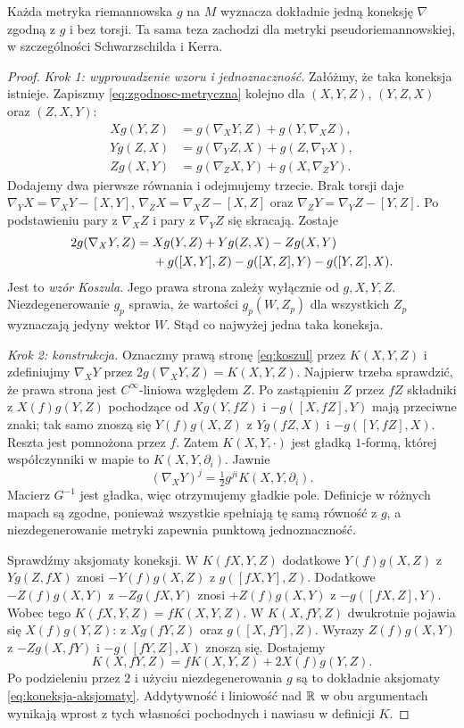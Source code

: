 \begin{twierdzenie}
\label{thm:levi-civita}
Każda metryka riemannowska $g$ na $M$ wyznacza
dokładnie jedną koneksję $\nabla$ zgodną z $g$
i bez torsji. Ta sama teza zachodzi dla metryki
pseudoriemannowskiej, w szczególności
Schwarzschilda i Kerra.
\end{twierdzenie}
\begin{proof}
\emph{Krok 1: wyprowadzenie wzoru i jednoznaczność.}
Załóżmy, że taka koneksja istnieje. Zapiszmy
\eqref{eq:zgodnosc-metryczna} kolejno dla
$(X,Y,Z)$, $(Y,Z,X)$ oraz $(Z,X,Y)$:
\begin{align*}
 Xg(Y,Z)&=g(\nabla_XY,Z)+g(Y,\nabla_XZ),\\
 Yg(Z,X)&=g(\nabla_YZ,X)+g(Z,\nabla_YX),\\
 Zg(X,Y)&=g(\nabla_ZX,Y)+g(X,\nabla_ZY).
\end{align*}
Dodajemy dwa pierwsze równania i odejmujemy
trzecie. Brak torsji daje
$\nabla_YX=\nabla_XY-[X,Y]$,
$\nabla_ZX=\nabla_XZ-[X,Z]$ oraz
$\nabla_ZY=\nabla_YZ-[Y,Z]$.
Po podstawieniu pary z $\nabla_XZ$ i pary
z $\nabla_YZ$ się skracają. Zostaje
\begin{align}\label{eq:koszul}
2g(\nabla_XY,Z)={}&Xg(Y,Z)+Yg(Z,X)-Zg(X,Y)\notag\\
 &+g([X,Y],Z)-g([X,Z],Y)-g([Y,Z],X).
\end{align}
Jest to \emph{wzór Koszula}. Jego prawa strona
zależy wyłącznie od $g,X,Y,Z$. Niezdegenerowanie
$g_p$ sprawia, że wartości $g_p(W,Z_p)$ dla
wszystkich $Z_p$ wyznaczają jedyny wektor $W$.
Stąd co najwyżej jedna taka koneksja.

\emph{Krok 2: konstrukcja.} Oznaczmy prawą stronę
\eqref{eq:koszul} przez $K(X,Y,Z)$ i zdefiniujmy
$\nabla_XY$ przez $2g(\nabla_XY,Z)=K(X,Y,Z)$.
Najpierw trzeba sprawdzić, że prawa strona
jest $C^\infty$-liniowa względem $Z$.
Po zastąpieniu $Z$ przez $fZ$ składniki z
$X(f)g(Y,Z)$ pochodzące od
$Xg(Y,fZ)$ i $-g([X,fZ],Y)$ mają przeciwne znaki;
tak samo znoszą się $Y(f)g(X,Z)$ z
$Yg(fZ,X)$ i $-g([Y,fZ],X)$.
Reszta jest pomnożona przez $f$.
Zatem $K(X,Y,\cdot)$ jest gładką $1$-formą,
której współczynniki w mapie to $K(X,Y,\partial_i)$.
Jawnie
\[
 (\nabla_XY)^j=\tfrac12g^{ji}K(X,Y,\partial_i).
\]
Macierz $G^{-1}$ jest gładka, więc otrzymujemy gładkie pole.
Definicje w różnych mapach są zgodne, ponieważ wszystkie
spełniają tę samą równość z $g$, a niezdegenerowanie
metryki zapewnia punktową jednoznaczność.

Sprawdźmy aksjomaty koneksji. W $K(fX,Y,Z)$
dodatkowe $Y(f)g(X,Z)$ z $Yg(Z,fX)$
znosi $-Y(f)g(X,Z)$ z $g([fX,Y],Z)$.
Dodatkowe $-Z(f)g(X,Y)$ z $-Zg(fX,Y)$
znosi $+Z(f)g(X,Y)$ z $-g([fX,Z],Y)$.
Wobec tego $K(fX,Y,Z)=fK(X,Y,Z)$.
W $K(X,fY,Z)$ dwukrotnie pojawia się
$X(f)g(Y,Z)$: z $Xg(fY,Z)$ oraz
$g([X,fY],Z)$. Wyrazy $Z(f)g(X,Y)$
z $-Zg(X,fY)$ i $-g([fY,Z],X)$
znoszą się. Dostajemy
\[
 K(X,fY,Z)=fK(X,Y,Z)+2X(f)g(Y,Z).
\]
Po podzieleniu przez $2$ i użyciu
niezdegenerowania $g$ są to dokładnie
aksjomaty \eqref{eq:koneksja-aksjomaty}.
Addytywność i liniowość nad $\mathbb{R}$ w obu argumentach
wynikają wprost z tych własności pochodnych i nawiasu
w definicji $K$.


\end{proof}
